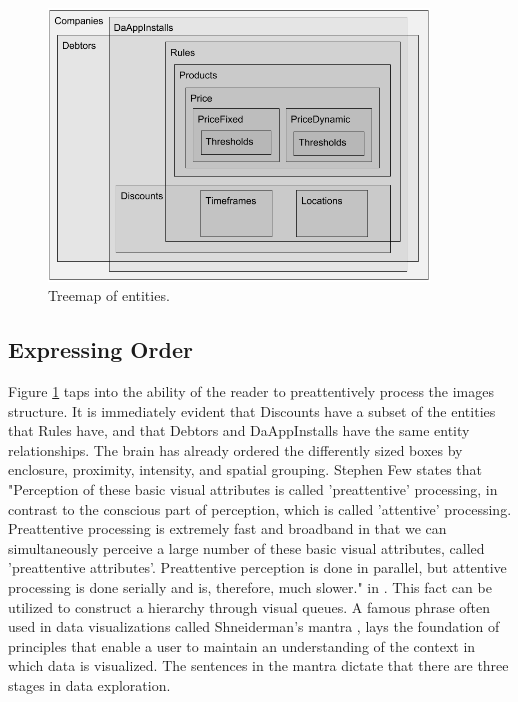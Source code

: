 \begin{figure}[H]
	\centering
	\includegraphics[width=0.9\textwidth]{Treemap}
	\caption[Treemap of Components]{Treemap of entities.}
	\label{fig:Treemap}
\end{figure}

\subsection{Expressing Order}
Figure \ref{fig:Treemap} taps into the ability of the reader to preattentively process the images structure. It is immediately evident that Discounts have a subset of the entities that Rules have, and that Debtors and DaAppInstalls have the same entity relationships. The brain has already ordered the differently sized boxes by enclosure, proximity, intensity, and spatial grouping. Stephen Few states that "Perception of these basic visual attributes is called 'preattentive' processing, in contrast to the conscious part of perception, which is called 'attentive' processing. Preattentive processing is extremely fast and broadband in that we can simultaneously perceive a large number of these basic visual attributes, called 'preattentive attributes'. Preattentive perception is done in parallel, but attentive processing is done serially and is, therefore, much slower." in \cite[p.~3]{few}. This fact can be utilized to construct a hierarchy through visual queues. A famous phrase often used in data visualizations called Shneiderman's mantra \cite{mantra}, lays the foundation of principles that enable a user to maintain an understanding of the context in which data is visualized. The sentences in the mantra dictate that there are three stages in data exploration.

